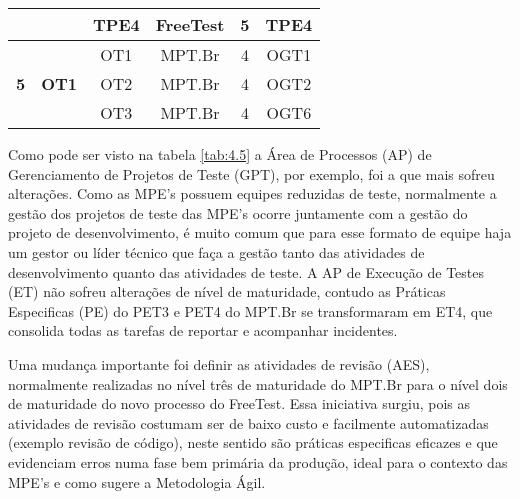 \begin{table}[!ht]
{\begin{tabular}{|c|c|c|c|c|c|}
                                                                                &                               & TPE4        & \textbf{FreeTest} & 5                                                                                  & TPE4                                                                      \\ \hline
\multirow{3}{*}{\textbf{5}}                                                     & \multirow{3}{*}{\textbf{OT1}} & OT1         & MPT.Br            & 4                                                                                  & OGT1                                                                      \\ \cline{3-6} 
                                                                                &                               & OT2         & MPT.Br            & 4                                                                                  & OGT2                                                                      \\ \cline{3-6} 
                                                                                &                               & OT3         & MPT.Br            & 4                                                                                  & OGT6                                                                      \\ \hline
\end{tabular}
}
\end{table}

Como pode ser visto na tabela \ref{tab:4.5} a Área de Processos (AP) de Gerenciamento de Projetos de Teste (GPT), por exemplo, foi a que mais sofreu alterações. Como as MPE's possuem equipes reduzidas de teste, normalmente a gestão dos projetos de teste das MPE's ocorre juntamente com a gestão do projeto de desenvolvimento, é muito comum que para esse formato de equipe haja um gestor ou líder técnico que faça a gestão tanto das atividades de desenvolvimento quanto das atividades de teste. A AP de Execução de Testes (ET) não sofreu alterações de nível de maturidade, contudo as Práticas Especificas (PE) do PET3 e PET4 do MPT.Br se transformaram em ET4, que consolida todas as tarefas de reportar e acompanhar incidentes.

Uma mudança importante foi definir as atividades de revisão (AES), normalmente realizadas no nível três de maturidade do MPT.Br para o nível dois de maturidade do novo processo do FreeTest. Essa iniciativa surgiu, pois as atividades de revisão costumam ser de baixo custo e facilmente automatizadas (exemplo revisão de código), neste sentido são práticas especificas eficazes e que evidenciam erros numa fase bem primária da produção, ideal para o contexto das MPE's e como sugere a Metodologia Ágil.

